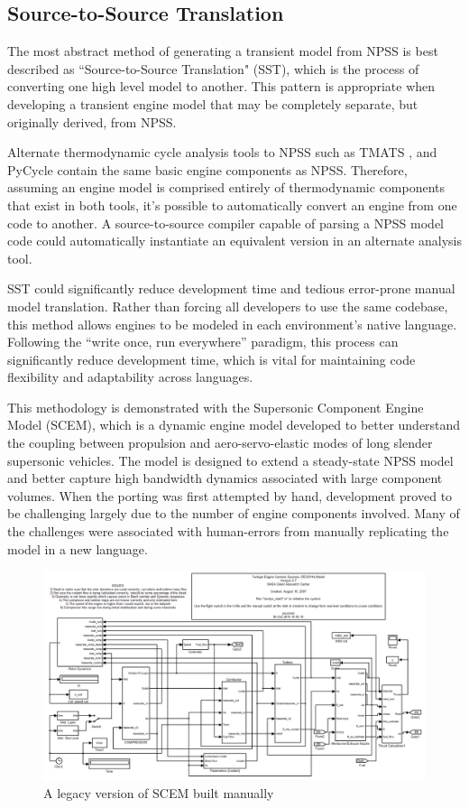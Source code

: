 \documentclass[heading.tex]{subfiles}
\begin{document}
\subsection{Source-to-Source Translation}

The most abstract method of generating a transient model from NPSS is best described as ``Source-to-Source Translation"
(SST), which is the process of converting one high level model to another. This pattern is appropriate when developing
a transient engine model that may be completely separate, but originally derived, from NPSS.

Alternate thermodynamic cycle analysis tools to NPSS such as TMATS \cite{TMATS} \cite{TMATS-NPSS}, and PyCycle
contain the same basic engine components as NPSS.
Therefore, assuming an engine model is comprised entirely of thermodynamic components that exist in both tools,
it's possible to automatically convert an engine from one code to another.
A source-to-source compiler capable of parsing a NPSS model code could automatically
instantiate an equivalent version in an alternate analysis tool.

SST could significantly reduce development time and tedious error-prone manual model translation.
Rather than forcing all developers to use the same codebase,
this method allows engines to be modeled in each environment's native language.
Following the ``write once, run everywhere'' paradigm,
this process can significantly reduce development time,
which is vital for maintaining code flexibility and adaptability across languages.

This methodology is demonstrated with the Supersonic Component Engine Model (SCEM), which is a dynamic engine model
developed to better understand the coupling between propulsion and aero-servo-elastic modes of long slender
supersonic vehicles. \cite{Volume Dynamic} \cite{Turbofan}
The model is designed to extend a steady-state NPSS model
and better capture high bandwidth dynamics associated with large component volumes. 
When the porting was first attempted by hand, 
development proved to be challenging largely due to the number of engine components involved.
Many of the challenges were associated with human-errors from manually replicating the model in a new language. 

\begin{figure}[H]
\centering
\includegraphics[width=1.0\textwidth]{images/original_scem_model}
\caption{A legacy version of SCEM built manually}
\label{f:legacySCEM}
\end{figure}
\end{document}

